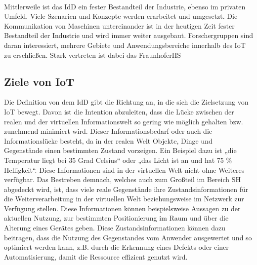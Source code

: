         \\
        \pagebreak
        \linebreak
        Mittlerweile ist das \acl{IdD} ein fester Bestandteil der Industrie, ebenso im privaten Umfeld. Viele 
        Szenarien und Konzepte werden erarbeitet und umgesetzt. Die Kommunikation von Maschinen untereinander 
        ist in der heutigen Zeit fester Bestandteil der Industrie und wird immer weiter ausgebaut. Forschergruppen sind daran interessiert, mehrere 
        Gebiete und Anwendungsbereiche innerhalb des \acs{IoT} zu erschließen. Stark vertreten ist dabei das \ac{FraunhoferIIS}

    \subsection{Ziele von \acs{IoT}}
    \label{subsec:ziele-iot}
        Die Definition von dem \acl{IdD} gibt die Richtung an, in die sich die Zielsetzung von 
        \acs{IoT} bewegt. Davon ist die Intention abzuleiten, dass die Lücke zwischen der realen und der 
        virtuellen Informationswelt so gering wie möglich gehalten bzw. zunehmend minimiert wird. 
        Dieser Informationsbedarf oder auch die Informationslücke besteht, da in der realen Welt Objekte, 
        Dinge und Gegenstände einen bestimmten Zustand vorzeigen. Ein Beispiel dazu ist „die Temperatur liegt bei 35 Grad Celsius“ 
        oder „das Licht ist an und hat 75 \% Helligkeit“. Diese Informationen sind in der virtuellen Welt nicht 
        ohne Weiteres verfügbar. 
        Das Bestreben demnach, welches auch zum Großteil im Bereich \acl{SH} abgedeckt wird, ist, dass 
        viele reale Gegenstände ihre Zustandsinformationen für die Weiterverarbeitung in der virtuellen 
        Welt beziehungsweise im Netzwerk zur Verfügung stellen. Diese Informationen können beispielsweise 
        Aussagen zu der aktuellen Nutzung, zur bestimmten Positionierung im Raum und 
        über die Alterung eines Gerätes geben. Diese Zustandsinformationen können dazu beitragen, dass die Nutzung des 
        Gegenstandes vom Anwender ausgewertet und so optimiert werden kann, z.B. durch die Erkennung 
        eines Defekts oder einer Automatisierung, damit die Ressource effizient genutzt wird. 



